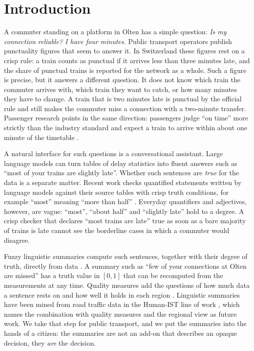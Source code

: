 \section{Introduction}
\label{sec:intro}

A commuter standing on a platform in Olten has a simple question: \emph{Is my connection
reliable? I have four minutes.} Public transport operators publish punctuality figures that
seem to answer it. In Switzerland these figures rest on a crisp rule: a train counts as
punctual if it arrives less than three minutes late, and the share of punctual trains is
reported for the network as a whole. Such a figure is precise, but it answers a different
question. It does not know which train the commuter arrives with, which train they want to
catch, or how many minutes they have to change. A train that is two minutes late is
punctual by the official rule and still makes the commuter miss a connection with a
two-minute transfer. Passenger research points in the same direction: passengers judge
``on time'' more strictly than the industry standard and expect a train to arrive within
about one minute of the timetable \citep{transportfocus2015}.

A natural interface for such questions is a conversational assistant. Large language models
can turn tables of delay statistics into fluent answers such as ``most of your trains are
slightly late''. Whether such sentences are \emph{true} for the data is a separate matter.
Recent work checks quantified statements written by language models against their source
tables with crisp truth conditions, for example ``most'' meaning ``more than half''
\citep{eida2026}. Everyday quantifiers and adjectives, however, are vague: ``most'',
``about half'' and ``slightly late'' hold to a degree. A crisp checker that declares ``most
trains are late'' true as soon as a bare majority of trains is late cannot see the
borderline cases in which a commuter would disagree.

Fuzzy linguistic summaries compute such sentences, together with their degree of truth,
directly from data \citep{yager1982,kacprzyk2009}. A summary such as ``few of your
connections at Olten are missed'' has a truth value in $[0, 1]$ that can be recomputed from
the measurements at any time. Quality measures add the questions of how much data a sentence
rests on and how well it holds in each region \citep{hudec2018,hudec2022}. Linguistic
summaries have been mined from road traffic data in the Human-IST line of work
\citep{pincay2021}, which names the combination with quality measures and the regional view
as future work. We take that step for public transport, and we put the summaries into the
hands of a citizen: the summaries are not an add-on that describes an opaque decision, they
\emph{are} the decision.

